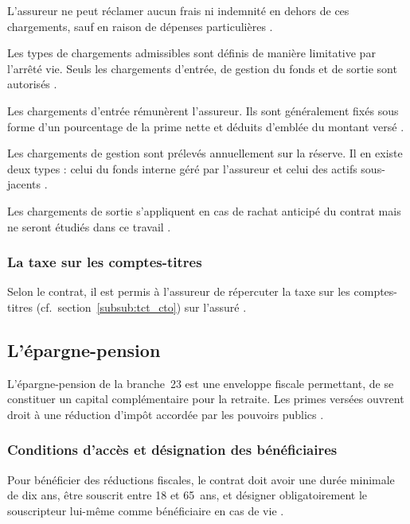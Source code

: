 ﻿\documentclass[12pt, a4paper]{article}
\begin{document}
L'assureur
ne peut réclamer aucun frais ni indemnité en dehors de ces chargements, sauf en raison de
dépenses particulières \cite[art.~28]{etaamb_2003}.

Les types de
chargements admissibles sont
définis de manière limitative par l'arrêté vie.
Seuls les chargements d'entrée, de gestion du fonds et de
sortie sont autorisés \cite[art.~27]{etaamb_2003}.

Les chargements d'entrée rémunèrent l'assureur. 
Ils sont généralement fixés sous forme d'un pourcentage de la prime nette et 
déduits d'emblée du montant versé \cite{wikifin_a}. 

Les chargements de gestion sont prélevés annuellement sur
la réserve. Il en existe deux types : celui du fonds interne géré
par l'assureur et celui des actifs sous-jacents
\cite{wikifin_a}.

Les chargements de sortie s'appliquent en cas de
rachat anticipé du contrat mais ne seront étudiés dans ce travail \cite{wikifin_a}.

\subsubsection*{La taxe sur les comptes-titres}

Selon le contrat, il est permis à l'assureur de
répercuter la taxe sur les comptes-titres (cf.~section~\ref{subsub:tct_cto}) sur l'assuré \cite{monastuces2021tact, spf_tct_faq}.

\subsection{L'épargne-pension}

L'épargne-pension de la branche~23 est une enveloppe fiscale permettant, de se
constituer un capital complémentaire pour la retraite. Les
primes versées ouvrent droit à une réduction d'impôt accordée
par les pouvoirs publics \cite[p.~115-116]{Binon2016}.

\subsubsection*{Conditions d'accès et désignation des
bénéficiaires}

Pour bénéficier des réductions fiscales, le contrat doit 
avoir une durée minimale de dix ans, être
souscrit entre 18 et 65~ans, et désigner obligatoirement le
souscripteur lui-même comme bénéficiaire en cas de vie 
\cite[art.~145\textsuperscript{9}]{cir92_2025}.
\end{document}
